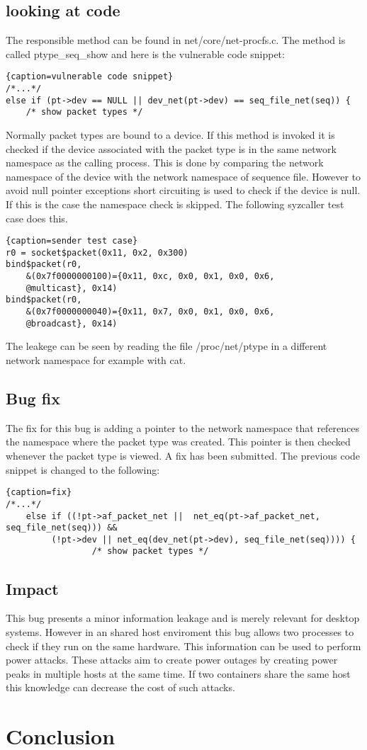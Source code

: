 \documentclass[10pt,twocolumn,a4paper]{article}
\begin{document}
\subsection{looking at code}
The responsible method can be found in net/core/net-procfs.c. The method is called ptype\_seq\_show
and here is the vulnerable code snippet:
\begin{lstlisting}{caption=vulnerable code snippet}
/*...*/
else if (pt->dev == NULL || dev_net(pt->dev) == seq_file_net(seq)) {
    /* show packet types */
\end{lstlisting}
Normally packet types are bound to a device. If this method is invoked it is checked if the device
associated with the packet type is in the same network namespace as the calling process. This is
done by comparing the network namespace of the device with the network namespace of sequence file.
However to avoid null pointer exceptions short circuiting is used to check if the device is null. If
this is the case the namespace check is skipped. The following syzcaller test case does this.
\begin{lstlisting}{caption=sender test case}
r0 = socket$packet(0x11, 0x2, 0x300)
bind$packet(r0, 
    &(0x7f0000000100)={0x11, 0xc, 0x0, 0x1, 0x0, 0x6,
    @multicast}, 0x14)
bind$packet(r0, 
    &(0x7f0000000040)={0x11, 0x7, 0x0, 0x1, 0x0, 0x6,
    @broadcast}, 0x14)
\end{lstlisting}
The leakege can be seen by reading the file /proc/net/ptype in a different network namespace for
example with cat.

\subsection{Bug fix}
The fix for this bug is adding a pointer to the network namespace that references the namespace
where the packet type was created. This pointer is then checked whenever the packet type is
viewed. A fix has been submitted.\cite{4}
The previous code snippet is changed to the following:
\begin{lstlisting}{caption=fix}
/*...*/
	else if ((!pt->af_packet_net ||  net_eq(pt->af_packet_net, seq_file_net(seq))) &&
		 (!pt->dev || net_eq(dev_net(pt->dev), seq_file_net(seq)))) {
                 /* show packet types */
\end{lstlisting}
\cite{4}
\subsection{Impact}
This bug presents a minor information leakage and is merely relevant for desktop systems.
However in an shared host enviroment this bug allows two processes to check if they run on the same
hardware. This information can be used to perform power attacks. These attacks aim to create power
outages by creating power peaks in multiple hosts at the same time. If two containers share the same
host this knowledge can decrease the cost of such attacks\cite{7}.
\section{Conclusion}



\end{document}
